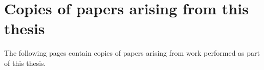 \documentclass[a4paper, twoside]{templates/ociamthesis}
\newcommand*{\bibtitle}{Bibliography}
\begin{document}
\hypertarget{published-papers}{%
\section{Copies of papers arising from this thesis}\label{published-papers}}

The following pages contain copies of papers arising from work performed as part of this thesis.







\setlength{\baselineskip}{0pt} %

{\renewcommand*\MakeUppercase[1]{#1}%
\printbibliography[heading=bibintoc,title={\bibtitle}]}
\end{document}
